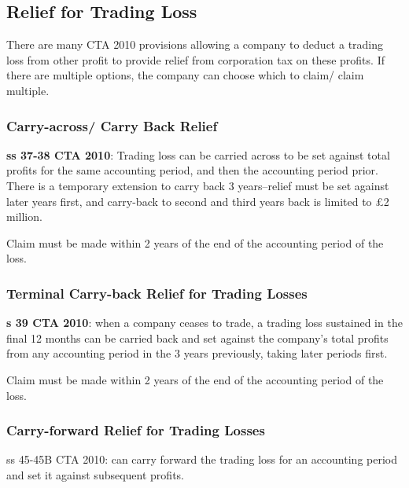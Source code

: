 \documentclass[
]{article}
\begin{document}
\hypertarget{relief-for-trading-loss}{%
\subsection{Relief for Trading Loss}\label{relief-for-trading-loss}}

There are many CTA 2010 provisions allowing a company to deduct a
trading loss from other profit to provide relief from corporation tax on
these profits. If there are multiple options, the company can choose
which to claim/ claim multiple.

\hypertarget{carry-across-carry-back-relief}{%
\subsubsection{Carry-across/ Carry Back
Relief}\label{carry-across-carry-back-relief}}

\textbf{ss 37-38 CTA 2010}: Trading loss can be carried across to be set
against total profits for the same accounting period, and then the
accounting period prior. There is a temporary extension to carry back 3
years--relief must be set against later years first, and carry-back to
second and third years back is limited to £2 million.

Claim must be made within 2 years of the end of the accounting period of
the loss.

\hypertarget{terminal-carry-back-relief-for-trading-losses}{%
\subsubsection{Terminal Carry-back Relief for Trading
Losses}\label{terminal-carry-back-relief-for-trading-losses}}

\textbf{s 39 CTA 2010}: when a company ceases to trade, a trading loss
sustained in the final 12 months can be carried back and set against the
company's total profits from any accounting period in the 3 years
previously, taking later periods first.

Claim must be made within 2 years of the end of the accounting period of
the loss.

\hypertarget{carry-forward-relief-for-trading-losses}{%
\subsubsection{Carry-forward Relief for Trading
Losses}\label{carry-forward-relief-for-trading-losses}}

ss 45-45B CTA 2010: can carry forward the trading loss for an accounting
period and set it against subsequent profits.
\end{document}
